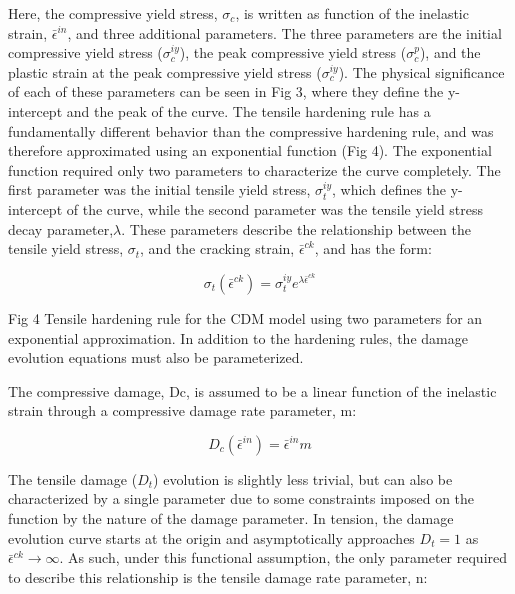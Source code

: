 Here, the compressive yield stress, $\sigma_{c}$, is written as function
of the inelastic strain, $\bar{\epsilon}^{in}$, and three additional parameters.
The three parameters are the initial compressive yield stress ($\sigma_{c}^{iy}$),
the peak compressive yield stress ($\sigma_{c}^{p}$), and the plastic
strain at the peak compressive yield stress ($\sigma_{c}^{iy}$).
The physical significance of each of these parameters can be seen
in Fig 3, where they define the y-intercept and the peak of the curve.
The tensile hardening rule has a fundamentally different behavior
than the compressive hardening rule, and was therefore approximated
using an exponential function (Fig 4). The exponential function required
only two parameters to characterize the curve completely. The first
parameter was the initial tensile yield stress, $\sigma_{t}^{iy}$,
which defines the y-intercept of the curve, while the second parameter
was the tensile yield stress decay parameter,$\lambda$. These parameters
describe the relationship between the tensile yield stress, $\sigma_{t}$,
and the cracking strain, $\bar{\epsilon}^{ck}$, and has the form: 

\begin{equation}
\sigma_{t}\left(\bar{\epsilon}^{ck}\right)=\sigma_{t}^{iy}e^{\lambda\bar{\epsilon}^{ck}}\label{eqn:param2}
\end{equation}


Fig 4 Tensile hardening rule for the CDM model using two parameters
for an exponential approximation. In addition to the hardening rules,
the damage evolution equations must also be parameterized. 

The compressive damage, Dc, is assumed to be a linear function of
the inelastic strain through a compressive damage rate parameter,
m: 

\begin{equation}
D_{c}\left(\bar{\epsilon}^{in}\right)=\bar{\epsilon}^{in}m\label{eqn:param3}
\end{equation}


The tensile damage ($D_{t}$) evolution is slightly less trivial,
but can also be characterized by a single parameter due to some constraints
imposed on the function by the nature of the damage parameter. In
tension, the damage evolution curve starts at the origin and asymptotically
approaches $D_{t}=1$ as $\bar{\epsilon}^{ck}\rightarrow\infty$.
As such, under this functional assumption, the only parameter required
to describe this relationship is the tensile damage rate parameter,
n: 

